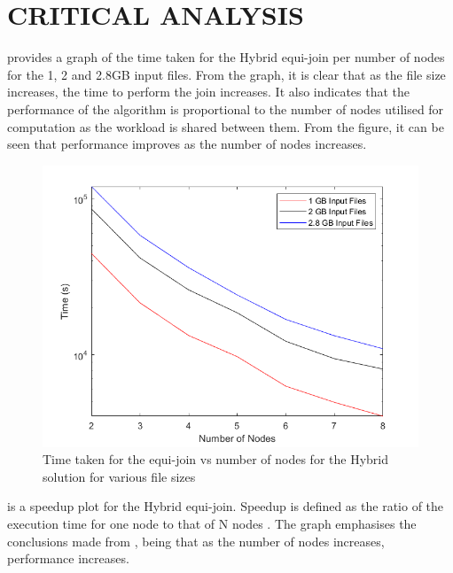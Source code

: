 \documentclass[12pt,twocolumn]{witseiepaper}
\begin{document}
\section{CRITICAL ANALYSIS}

 provides a graph of the time taken for the Hybrid equi-join per number of nodes for the 1, 2 and 2.8GB input files. From the graph, it is clear that as the file size increases, the time to perform the join increases. It also indicates that the performance of the algorithm is proportional to the number of nodes utilised for computation as the workload is shared between them. From the figure, it can be seen that performance improves as the number of nodes increases.

\begin{figure}[h]
	\centering
	\includegraphics[width=1\columnwidth]{hybrid-time.png}
	\caption{Time taken for the equi-join vs number of nodes for the Hybrid solution for various file sizes}
	\raggedright
	\label{fig:resultsH}	
\end{figure}

 is a speedup plot for the Hybrid equi-join. Speedup is defined as the ratio of the execution time for one node to that of N nodes \cite{speedup}. The graph emphasises the conclusions made from , being that as the number of nodes increases, performance increases.
\end{document}
